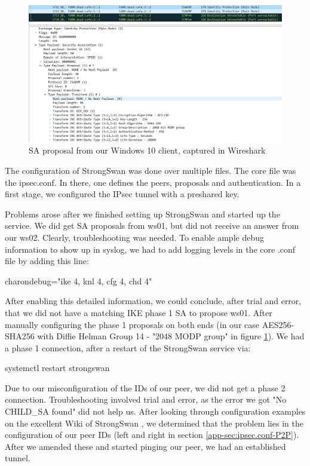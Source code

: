 \documentclass[a4paper]{report}
\begin{document}
\begin{figure}[htb]
	\includegraphics[width=\linewidth]{IPsec_Proposal_Win10_client.png}
	\caption{SA proposal from our Windows 10 client, captured in Wireshark}
	\label{fig:FirstSAProposal}
\end{figure}

The configuration of StrongSwan was done over multiple files. The core file was the ipsec.conf. In there, one defines the peers, proposals and authentication.
In a first stage, we configured the IPsec tunnel with a preshared key.

Problems arose after we finished setting up StrongSwan and started up the service. We did get SA proposals from ws01, but did not receive an answer from our ws02. Clearly, troubleshooting was needed. To enable ample debug information to show up in syslog, we had to add logging levels in the core .conf file by adding this line:
\begin{codebox}
	charondebug="ike 4, knl 4, cfg 4, chd 4"
\end{codebox}
After enabling this detailed information, we could conclude, after trial and error, that we did not have a matching IKE phase 1 SA to propose ws01. After manually configuring the phase 1 proposals on both ends (in our case AES256-SHA256 with Diffie Helman Group 14 - "2048 MODP group" in figure \ref{fig:FirstSAProposal}). We had a phase 1 connection, after a restart of the StrongSwan service via:
\begin{codebox}
	systemctl restart strongswan
\end{codebox}
Due to our misconfiguration of the IDs of our peer, we did not get a phase 2 connection. Troubleshooting involved trial and error, as the error we got "No CHILD\_SA found" did not help us. After looking through configuration examples on the excellent Wiki of StrongSwan \parencite{Lang2017}, we determined that the problem lies in the configuration of our peer IDs (left and right in section \ref{app-sec:ipsec.conf-P2P}). After we amended these and started pinging our peer, we had an established tunnel.
\end{document}
